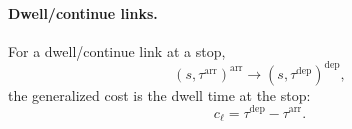 \paragraph{Dwell/continue links.}
For a dwell/continue link at a stop,
\[
(s,\tau^{\mathrm{arr}})^{\mathrm{arr}} \rightarrow (s,\tau^{\mathrm{dep}})^{\mathrm{dep}},
\]
the generalized cost is the dwell time at the stop:
\[
c_\ell = \tau^{\mathrm{dep}} - \tau^{\mathrm{arr}} .
\]

